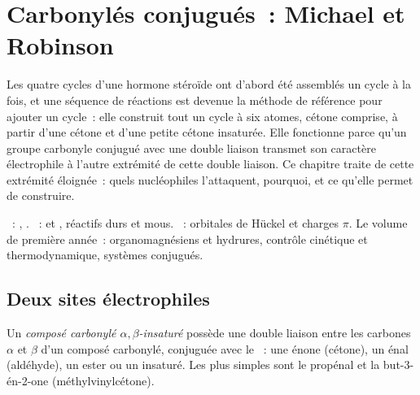 \chapter{Carbonylés conjugués~: Michael et Robinson}\label{ch:b2:conjugate-additions}

Les quatre cycles d'une hormone stéroïde ont d'abord été assemblés un cycle à la fois, et une
séquence de réactions est devenue la méthode de référence pour ajouter un cycle~: elle construit
tout un cycle à six atomes, cétone comprise, à partir d'une cétone et d'une petite cétone
insaturée. Elle fonctionne parce qu'un groupe carbonyle conjugué avec une double liaison 
transmet son caractère électrophile à l'autre extrémité de cette double liaison. Ce chapitre traite
de cette extrémité éloignée~: quels nucléophiles l'attaquent, pourquoi, et ce qu'elle permet de construire.

\begin{recall}
~: , . ~:  et , réactifs durs et mous. ~: orbitales de Hückel et
charges $\pi$. Le volume de première année~: organomagnésiens et hydrures, contrôle cinétique et
thermodynamique, systèmes conjugués.
\end{recall}

\section{Deux sites électrophiles}

\begin{definition}\label{def:b2:conjugate-additions:enone}
Un \emph{composé carbonylé $\alpha,\beta$-insaturé}
possède une double liaison  entre les carbones $\alpha$
et $\beta$ d'un composé carbonylé, conjuguée avec le ~: une énone (cétone), un énal
(aldéhyde), un ester ou un  insaturé. Les plus simples sont le propénal  et
la but-3-én-2-one  (méthylvinylcétone).
\end{definition}

